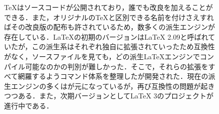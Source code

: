 \begin{figure}[bt]
\begin{itembox}[l]{\gtbf{{\TeX}, {\LaTeX}, {\LaTeXe}}}
\small\sffamily\mgfamily
{\TeX}はソースコードが公開されており，誰でも改良を加えることができる．また，オリジナルの{\TeX}と区別できる名前を付けさえすればその改良版の配布も許されているため，数多くの派生エンジンが存在している．{\LaTeX}の初期のバージョンは{\LaTeX} 2.09と呼ばれていたが，この派生系はそれぞれ独自に拡張されていったため互換性がなく，ソースファイルを見ても，どの派生{\LaTeX}エンジンでコンパイル可能なのかの判別が難しかった．そこで，それらの拡張をすべて網羅するようコマンド体系を整理した{\LaTeXe}が開発された．現在の派生エンジンの多くは{\LaTeXe}が元になっているが，再び互換性の問題が起きつつある．また，次期バージョンとして{\LaTeX} 3のプロジェクトが進行中である．
\end{itembox}
\end{figure}
